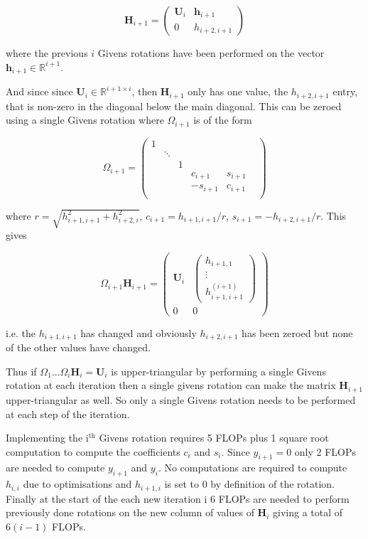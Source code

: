 \documentclass{article}
\newcommand{\RR}{\mathbb{R}}
\begin{document}
\begin{enumerate}
\begin{enumerate}
		$$
		\boldsymbol{H}_{i+1} = \begin{pmatrix}
			\boldsymbol{U}_i & \boldsymbol{h}_{i+1} \\
			0 &	h_{i+2,i+1}
		\end{pmatrix}
		$$
		
		where the previous $i$ Givens rotations have been performed on the vector $\boldsymbol{h}_{i+1} \in \RR^{i+1}$.

		And since since $\boldsymbol{U}_i \in \RR^{i+1 \times i}$, then $\boldsymbol{H}_{i+1}$ only has one value, the $h_{i+2,i+1}$ entry, that is non-zero in the diagonal below the main diagonal. This can be zeroed using a single Givens rotation where $\Omega_{i+1}$ is of the form
		
		$$
		\Omega_{i+1} = 
		\begin{pmatrix}
	    1 & & &&& \\
	      & \ddots  & &&& \\
	      && 1 &&&\\
	      &  		&& c_{i+1} & s_{i+1}  & \\
	      & 		&& -s_{i+1} & c_{i+1} & \\
		\end{pmatrix} 
		$$
		
		where $r = \sqrt{ h_{i+1,i+1}^2 + h_{i+2, i}^2}$, $c_{i+1} = h_{i+1,i+1} / r$, $s_{i+1} = - h_{ i+2, i+1} / r$. This gives
		
		$$
		\Omega_{i+1} \boldsymbol{H}_{i+1} =  \begin{pmatrix}
			\boldsymbol{U}_i & \begin{pmatrix} h_{i+1,1}\\ \vdots\\  h_{i+1,i+1}^{(i+1)} \end{pmatrix} \\
			0 &	0
		\end{pmatrix}
		$$
		
		i.e. the $h_{i+1,i+1}$ has changed and obviously $h_{i+2,i+1}$ has been zeroed but none of the other values have changed. 
		
		Thus if $\Omega_1 \dots \Omega_i \boldsymbol{H}_i = \boldsymbol{U}_i$ is upper-triangular by performing a single Givens rotation at each iteration then a single givens rotation can make the matrix $\boldsymbol{H}_{i+1}$ upper-triangular as well. So only a single Givens rotation needs to be performed at each step of the iteration.
		
		Implementing the i$^\text{th}$ Givens rotation requires 5 FLOPs plus 1 square root computation to compute the coefficients $c_i$ and $s_i$. Since $y_{i+1} = 0$ only 2 FLOPs are needed to compute $y_{i+1}$ and $y_i$. No computations are required to compute $h_{i,i}$ due to optimisations and $h_{i+1,i}$ is set to 0 by definition of the rotation. Finally at the start of the each new iteration i 6 FLOPs are needed to perform previously done rotations on the new column of values of $\boldsymbol{H}_i$ giving a total of $6(i-1)$ FLOPs. 
		

\end{enumerate}
\end{enumerate}
\end{document}
